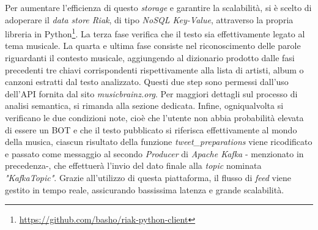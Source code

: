 \documentclass[12pt, a4paper, twocolumn]{article} %
\begin{document}
Per aumentare l'efficienza di questo \textit{storage} e garantire la scalabilità, si è scelto di adoperare il \textit{data store Riak}, di tipo \textit{NoSQL Key-Value}, attraverso la propria libreria in Python\footnote{\url{https://github.com/basho/riak-python-client}}. 
La terza fase verifica che il testo sia effettivamente legato al tema musicale. 
La quarta e ultima fase consiste nel riconoscimento delle parole riguardanti il contesto musicale, aggiungendo al dizionario prodotto dalle fasi precedenti tre chiavi corrispondenti rispettivamente alla lista di artisti, album o canzoni estratti dal testo analizzato. 
Questi due step sono permessi dall'uso dell'API fornita dal sito \textit{musicbrainz.org}. 
Per maggiori dettagli sul processo di analisi semantica, si rimanda alla sezione dedicata. 
Infine, ogniqualvolta si verificano le due condizioni note, cioè che l'utente non abbia probabilità elevata di essere un BOT e che il testo pubblicato si riferisca effettivamente al mondo della musica, ciascun risultato della funzione \textit{tweet\_preparations} viene ricodificato e passato come messaggio al secondo \textit{Producer} di \textit{Apache Kafka} - menzionato in precedenza-, che effettuerà l'invio del dato finale alla \textit{topic} nominata \textit{"KafkaTopic"}. 
Grazie all'utilizzo di questa piattaforma, il flusso di \textit{feed} viene gestito in tempo reale, assicurando bassissima latenza e grande scalabilità. 
\end{document}
